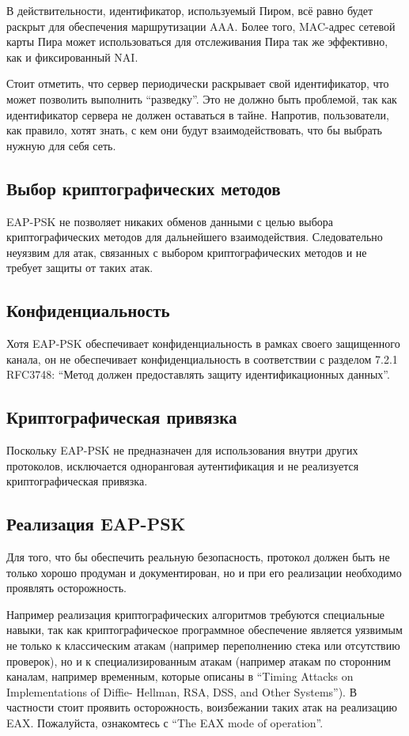 В действительности, идентификатор, используемый Пиром, всё равно будет раскрыт для обеспечения маршрутизации AAA. Более того, MAC-адрес сетевой карты Пира может использоваться для отслеживания Пира так же эффективно, как и фиксированный NAI.

Стоит отметить, что сервер периодически раскрывает свой идентификатор, что может позволить выполнить ``разведку''. Это не должно быть проблемой, так как идентификатор сервера не должен оставаться в тайне.  Напротив, пользователи, как правило, хотят знать, с кем они будут взаимодействовать, что бы выбрать нужную для себя сеть.

\subsection{Выбор криптографических методов}

EAP-PSK не позволяет никаких обменов данными с целью выбора криптографических методов для дальнейшего взаимодействия. Следовательно неуязвим для атак, связанных с выбором криптографических методов и не требует защиты от таких атак.

\subsection{Конфиденциальность}

Хотя EAP-PSK обеспечивает конфиденциальность в рамках своего защищенного канала, он не обеспечивает конфиденциальность в соответствии с разделом 7.2.1 RFC3748: ``Метод должен предоставлять защиту идентификационных данных''.

\subsection{Криптографическая привязка}

Поскольку EAP-PSK не предназначен для использования внутри других протоколов, исключается одноранговая аутентификация и не реализуется криптографическая привязка.

\subsection{Реализация EAP-PSK}

Для того, что бы обеспечить реальную безопасность, протокол должен быть не только хорошо продуман и документирован, но и при его реализации необходимо проявлять осторожность.

Например реализация криптографических алгоритмов требуются специальные навыки, так как криптографическое программное обеспечение является уязвимым не только к классическим атакам (например переполнению стека или отсутствию проверок), но и к специализированным атакам (например атакам по сторонним каналам, например временным, которые описаны в ``Timing Attacks on Implementations of Diffie- Hellman, RSA, DSS, and Other Systems''). В частности стоит проявить осторожность, воизбежании таких атак на реализацию EAX. Пожалуйста, ознакомтесь с ``The EAX mode of operation''.

